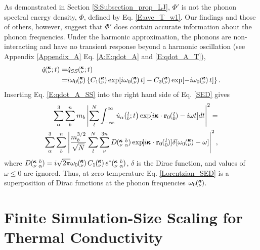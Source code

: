 \documentclass[aps,prb,preprint,superscriptaddress,amsmath,amssymb,floatfix]{revtex4}
\newcommand{\EXP}[1]{\exp\mspace{-5.0mu}\left[#1\right]\mspace{-3.0mu}}
\newcommand{\ab}[2]{\mspace{-4.0mu}\left(\mspace{-8.0mu}\begin{smallmatrix}&\ifthenelse{\equal{#1}{}}{a}{#1} \\&\ifthenelse{\equal{#2}{}}{b}{#2}\end{smallmatrix}\mspace{-3.0mu}\right)}
\newcommand{\kvba}{\mspace{-4.0mu}\left(\mspace{-8.0mu}\begin{smallmatrix} &\pmb{\kappa} &b \\ &\nu &\alpha\end{smallmatrix}\mspace{-3.0mu}\right)}
\newcommand{\kvt}{\mspace{-4.0mu}\left(\mspace{-8.0mu}\begin{smallmatrix}&\pmb{\kappa} \\&\nu\end{smallmatrix}\mspace{-2.0mu};t\right)}
\newcommand{\kv}{\mspace{-4.0mu}\left(\mspace{-8.0mu}\begin{smallmatrix}&\pmb{\kappa} \\&\nu\end{smallmatrix}\mspace{-3.0mu}\right)}
\newcommand{\lbt}{\mspace{-4.0mu}\left(\mspace{-8.0mu}\begin{smallmatrix}&l \\&b\end{smallmatrix}\mspace{-2.0mu};t\right)}
\begin{document}
As demonstrated in Section \ref{S:Subsection_prop_LJ}, $\Phi'$ is not the phonon spectral energy density, $\Phi$, defined by Eq$.$ \eqref{E:ave_T_w1}. Our findings and those of others,\cite{maruyama2003,dekoker2009,thomas2010c,qiu2011,shiomi2011a} however, suggest that $\Phi'$ does contain accurate information about the phonon frequencies.  Under the harmonic approximation, the phonons are non-interacting and have no transient response beyond a harmonic oscillation (see Appendix \ref{Appendix_A} Eq$.$ \eqref{A:E:qdot_A} and \eqref{E:qdot_A_T}),
\begin{equation}\label{E:qdot_A_SS}
\begin{split}
\dot{q}\kvt =& \dot{q}_{SS}\kvt  \\
=& i\omega_0\kv\left\{C_1\kv\exp[i\omega_0\kv t]-C_2\kv\exp[-i\omega_0\kv t]\right\}.
 \end{split}
\end{equation}
Inserting Eq$.$ \eqref{E:qdot_A_SS} into the right hand side of Eq$.$ \eqref{SED} gives
\begin{equation}\label{Delta_SED}
\begin{split}
\sum_\alpha^3 \sum_b^n m_b \left| \sum_l^N  \int_{-\infty}^{\infty} \dot{u}_{\alpha}\lbt \EXP{i\pmb{\kappa}\cdot\mathbf{r}_0\ab{l}{0}-i\omega t} dt \right|^2 =& \\
\sum_\alpha^3 \sum_b^n\left| \frac{m_b^{3/2}}{\sqrt{N}} \sum_l^N \sum_{\nu}^{3n}  D\kvba \EXP{i\pmb{\kappa}\cdot\mathbf{r}_0\ab{l}{0}} \delta[ \omega_0\kv - \omega] \right|^2 ,
 \end{split}
\end{equation}
where $D\kvba = i\sqrt{2\pi} \omega_0\kv C_1\kv e^*\kvba$, $\delta$ is the Dirac function, and values of $\omega \le 0$ are ignored. Thus, at zero temperature Eq$.$ \eqref{Lorentzian_SED} is a superposition of Dirac functions at the phonon frequencies $\omega_0\kv$.

\section{\label{Appendix_C}Finite Simulation-Size Scaling for Thermal Conductivity}
\end{document}
